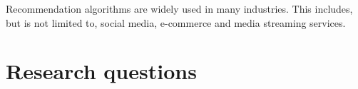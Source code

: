 
Recommendation algorithms are widely used in many industries. This includes, but is not limited to, social media, e-commerce and media streaming services.





\section{Research questions}

\TODO{}